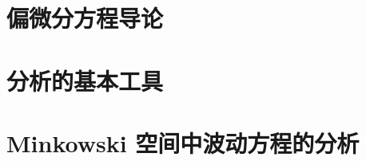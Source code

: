 \documentclass[
  BookTitleCN={分析讲义},
  BookTitleEN={LECTURE NOTES IN ANALYSIS (2011)},
  OriginalAuthor={Sergiu Klainerman},
  OriginalEdition={2011 年讲义(普林斯顿大学)},
  OriginalPublisher={Princeton University},
  OriginalYear={2011},
  Translator={Fingolfin},
  ModelUsed={DeepSeek-V4-Flash+混元3},
  TranslationDate={28 Aug 2026}
]{mathtranslation}
\begin{document}
\hfill \TranslationDate

\newpage
\begingroup
\pagestyle{empty}
\thispagestyle{empty}
\tableofcontents
\clearpage
\endgroup

\mainmatter
{}
\setcounter{page}{1}
\pagestyle{fancy}

\part{偏微分方程导论}







\part{分析的基本工具}






\part{Minkowski 空间中波动方程的分析}






\appendix


\clearpage

\printterminology
\end{document}
